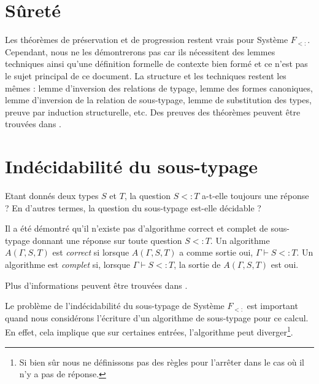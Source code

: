 \section{Sûreté}

Les théorèmes de préservation et de progression restent vrais pour Système
$F_{<:}$. Cependant, nous ne les démontrerons pas car ils nécessitent des lemmes
techniques ainsi qu'une définition formelle de contexte bien formé et ce n'est
pas le sujet principal de ce document. La structure
et les techniques restent les mêmes : lemme d'inversion des relations de typage,
lemme des formes canoniques, lemme d'inversion de la relation de sous-typage, lemme de
substitution des types, preuve par induction structurelle, etc.
Des preuves des théorèmes peuvent être trouvées dans
\cite{tapl-bounded-quantification}.

\section{Indécidabilité du sous-typage}

Etant donnés deux types $S$ et $T$, la question $S <: T$ a-t-elle
toujours une réponse ? En d'autres termes, la question du sous-typage est-elle
décidable ?

Il a été démontré qu'il n'existe pas d'algorithme correct et complet de sous-typage donnant une
réponse sur toute question $S <: T$.
Un algorithme $A(\Gamma, S, T)$ est \textit{correct} si lorsque $A(\Gamma, S,
T)$ a comme sortie oui, $\Gamma \vdash S <: T$. Un algorithme est
\textit{complet} si, lorsque $\Gamma \vdash S <: T$, la sortie de $A(\Gamma, S,
T)$ est oui.

Plus d'informations peuvent être trouvées
dans \cite{tapl-bounded-quantification-metatheory}.

Le problème de l'indécidabilité du sous-typage de Système $F_{<:}$ est important
quand nous considérons l'écriture d'un algorithme de sous-typage pour ce calcul.
En effet, cela implique que sur certaines entrées, l'algorithme peut
diverger\footnote{Si bien sûr nous ne définissons pas des règles pour l'arrêter
  dans le cas où il n'y a pas de réponse.}.